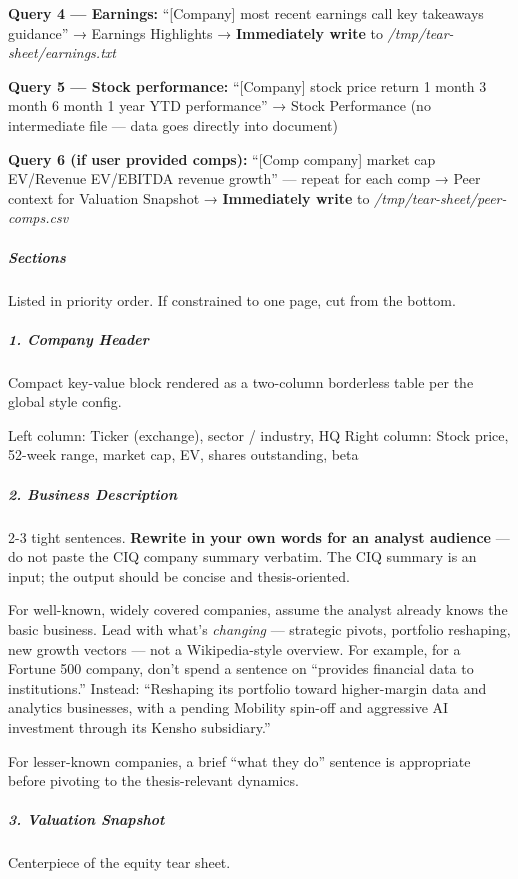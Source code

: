 \documentclass[11pt]{article}
\begin{document}
\textbf{Query 4 — Earnings:} ``[Company] most recent earnings call key takeaways guidance'' → Earnings Highlights → \textbf{Immediately write} to \emph{/tmp/tear-sheet/earnings.txt}


\textbf{Query 5 — Stock performance:} ``[Company] stock price return 1 month 3 month 6 month 1 year YTD performance'' → Stock Performance (no intermediate file — data goes directly into document)


\textbf{Query 6 (if user provided comps):} ``[Comp company] market cap EV/Revenue EV/EBITDA revenue growth'' — repeat for each comp → Peer context for Valuation Snapshot → \textbf{Immediately write} to \emph{/tmp/tear-sheet/peer-comps.csv}


\subparagraph{Sections}\mbox{}\par

Listed in priority order. If constrained to one page, cut from the bottom.


\subparagraph{1. Company Header}\mbox{}\par
Compact key-value block rendered as a two-column borderless table per the global style config.


Left column: Ticker (exchange), sector / industry, HQ Right column: Stock price, 52-week range, market cap, EV, shares outstanding, beta


\subparagraph{2. Business Description}\mbox{}\par
2-3 tight sentences. \textbf{Rewrite in your own words for an analyst audience} — do not paste the CIQ company summary verbatim. The CIQ summary is an input; the output should be concise and thesis-oriented.


For well-known, widely covered companies, assume the analyst already knows the basic business. Lead with what's \emph{changing} — strategic pivots, portfolio reshaping, new growth vectors — not a Wikipedia-style overview. For example, for a Fortune 500 company, don't spend a sentence on ``provides financial data to institutions.'' Instead: ``Reshaping its portfolio toward higher-margin data and analytics businesses, with a pending Mobility spin-off and aggressive AI investment through its Kensho subsidiary.''


For lesser-known companies, a brief ``what they do'' sentence is appropriate before pivoting to the thesis-relevant dynamics.


\subparagraph{3. Valuation Snapshot}\mbox{}\par
Centerpiece of the equity tear sheet.
\end{document}
